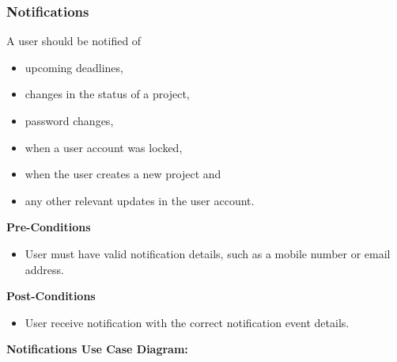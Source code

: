 \pagebreak
\subsubsection{Notifications}
A user should be notified of
\begin{itemize}
	\item upcoming deadlines,
	\item changes in the status of a project,
	\item password changes,
	\item when a user account was locked,
	\item when the user creates a new project and
	\item any other relevant updates in the user account.\\
\end{itemize}
\textbf{Pre-Conditions}
\begin{itemize}
	\item User must have valid notification details, such as a mobile number or email address.\\
\end{itemize}
\textbf{Post-Conditions}
\begin{itemize}
	\item User receive notification with the correct notification event details.\\
\end{itemize}
\textbf{Notifications Use Case Diagram:}\\
\centerline{}
